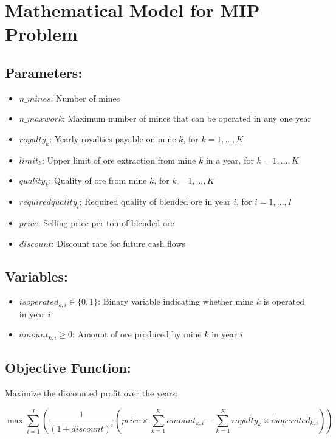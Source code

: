 \documentclass{article}
\begin{document}
\section*{Mathematical Model for MIP Problem}

\subsection*{Parameters:}

\begin{itemize}
    \item $n\_mines$: Number of mines
    \item $n\_maxwork$: Maximum number of mines that can be operated in any one year
    \item $royalty_{k}$: Yearly royalties payable on mine $k$, for $k = 1, \ldots, K$
    \item $limit_{k}$: Upper limit of ore extraction from mine $k$ in a year, for $k = 1, \ldots, K$
    \item $quality_{k}$: Quality of ore from mine $k$, for $k = 1, \ldots, K$
    \item $requiredquality_{i}$: Required quality of blended ore in year $i$, for $i = 1, \ldots, I$
    \item $price$: Selling price per ton of blended ore
    \item $discount$: Discount rate for future cash flows
\end{itemize}

\subsection*{Variables:}

\begin{itemize}
    \item $isoperated_{k, i} \in \{0, 1\}$: Binary variable indicating whether mine $k$ is operated in year $i$
    \item $amount_{k, i} \geq 0$: Amount of ore produced by mine $k$ in year $i$
\end{itemize}

\subsection*{Objective Function:}

Maximize the discounted profit over the years:

\[
\max \sum_{i=1}^{I} \left( \frac{1}{(1 + discount)^i} \left( price \times \sum_{k=1}^{K} amount_{k, i} - \sum_{k=1}^{K} royalty_{k} \times isoperated_{k, i} \right) \right)
\]
\end{document}
